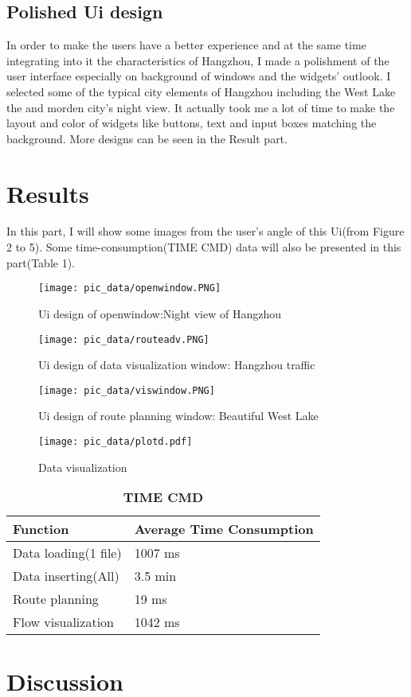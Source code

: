 \documentclass[transmag]{IEEEtran}
\begin{document}
\subsection{Polished Ui design}
   In order to make the users have a better experience and at the same time
  integrating into it the characteristics of Hangzhou, I made a polishment of the user interface
   especially on background of windows and the widgets' outlook. I 
   selected some of the typical city elements of Hangzhou including the West Lake the and
   morden city's night view. It actually took me a lot of time to make the layout and
   color of widgets like buttons, text and input boxes matching the background.
   More designs can be seen in the Result part.

\section{Results}
In this part, I will show some images from the user's angle of this Ui(from Figure 2 to 5).
Some time-consumption(TIME CMD) data will also be presented in this part(Table 1).

\begin{figure}
  \centerline{\texttt{[image: pic\_data/openwindow.PNG]}}
  \caption{Ui design of openwindow:Night view of Hangzhou}
  \end{figure}

  \begin{figure}
    \centerline{\texttt{[image: pic\_data/routeadv.PNG]}}
    \caption{Ui design of data visualization window: Hangzhou traffic}
  \end{figure}

    \begin{figure}
      \centerline{\texttt{[image: pic\_data/viswindow.PNG]}}
      \caption{Ui design of route planning window: Beautiful West Lake}

      \end{figure}

      \begin{figure}
        \centerline{\texttt{[image: pic\_data/plotd.pdf]}}
        \caption{Data visualization}
        \end{figure}

        \begin{table}
          \centering
        \caption{\textbf{TIME CMD}}
        \label{table}
        \setlength{\tabcolsep}{3pt}
        \begin{tabular}{|p{125pt}|p{125pt}|}
          \hline
        Function & Average Time Consumption \\
        
        \hline
        Data loading(1 file) & 1007 ms \\
        Data inserting(All) &  3.5 min \\ 
        Route planning &  19 ms\\
        Flow visualization &  1042 ms\\
        
        
        \hline
        \end{tabular}
        \label{tab1}
        \end{table}

\section{Discussion}
   
\end{document}
